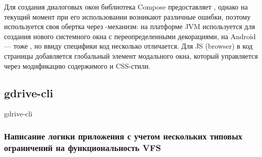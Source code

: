     Для создания диалоговых окон библиотека Compose предоставляет , однако на текущий момент при его использовании возникают различные ошибки\cite{gh-compose-alert-dialog,gh-compose-alert-dialog-2}, поэтому используется своя обертка через -механизм: на платформе JVM используется  для создания нового системного окна с переопределенными декорациями, на Android --- тоже , но ввиду специфики код несколько отличается. Для JS (browser) в код страницы добавляется глобальный элемент модального окна, который управляется через модификацию содержимого и CSS-стили.

\subsection{gdrive-cli}
  gdrive-cli\cite{gh-gdrive-cli} \todo{}
  \subsubsection{Написание логики приложения с учетом нескольких типовых ограничений на функциональность VFS}


